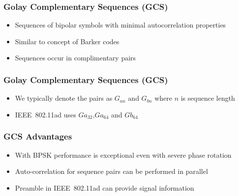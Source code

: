 \documentclass[10pt]{beamer}
\begin{document}
\frame
{
  \frametitle{Golay Complementary Sequences (GCS)}

    \begin{itemize}
        \item Sequences of bipolar symbols with minimal autocorrelation properties
        \item Similar to concept of Barker codes 
        \item Sequences occur in complimentary pairs
        
    \end{itemize}

}

\frame
{
  \frametitle{Golay Complementary Sequences (GCS)}

    \begin{itemize}
        \item We typically denote the pairs as $G_{an}$ and $G_{bn}$ where $n$ is sequence length 
        \item IEEE~802.11ad uses $Ga_{32}$,$Ga_{64}$ and $Gb_{64}$
    \end{itemize}

}
\frame
{
  \frametitle{GCS Advantages}

    \begin{itemize}
       \item With BPSK performance is exceptional even with severe phase rotation  
        \item Auto-correlation for sequence pairs can be performed in parallel 
        \item Preamble in IEEE~802.11ad can provide signal information 
    \end{itemize}

}
\end{document}
